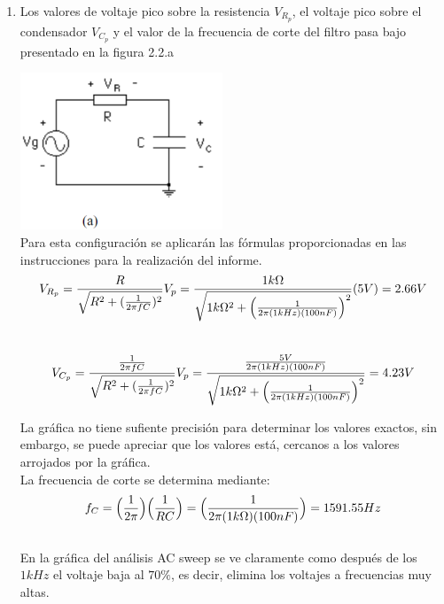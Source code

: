 \documentclass[12pt]{article}
\begin{document}
\begin{enumerate}
		\item Los valores de voltaje pico sobre la resistencia $V_{R_p}$, el
		voltaje pico sobre el condensador $V_{C_p}$ y el valor de la
		frecuencia de corte del filtro pasa bajo presentado en la figura 2.2.a
		
		\includegraphics{Img/2_2_a}\\
		
		\noindent Para esta configuración se aplicarán las fórmulas proporcionadas en las instrucciones para la realización del informe.\\
		
		\begin{equation}
			\notag V_{R_p} = \frac{R}{\sqrt{R^2 + (\frac{1}{2\pi f C})^2}}V_p = \frac{1k\Omega}{\sqrt{1k\Omega ^2 + \Big (\frac{1}{2\pi (1kHz) (100nF)}\Big)^2}}(5V) = 2.66V
		\end{equation}
		\\
		
		\begin{equation}
			\notag V_{C_p} = \frac{\frac{1}{2 \pi f C}}{\sqrt{R^2 + (\frac{1}{2\pi f C})^2}}V_p = \frac{\frac{5V}{2\pi (1kHz) (100nF)}}{\sqrt{1k\Omega ^2 + \Big (\frac{1}{2\pi (1kHz) (100nF)}\Big)^2}} = 4.23V
		\end{equation}
		
		\noindent La gráfica no tiene sufiente precisión para determinar los valores exactos, sin embargo, se puede apreciar que los valores está, cercanos a los valores arrojados por la gráfica.\\
		
		\noindent La frecuencia de corte se determina mediante:\\
		
		\begin{equation}
			\notag f_C = \Big(\frac{1}{2\pi}\Big)\Big(\frac{1}{RC}\Big) = \Big(\frac{1}{2\pi (1k\Omega)(100nF)}\Big) = 1591.55Hz
		\end{equation}\\
		
		\noindent En la gráfica del análisis AC sweep se ve claramente como después de los $1kHz$ el voltaje baja al $70\%$, es decir, elimina los voltajes a frecuencias muy altas.\\
		

\end{enumerate}
\end{document}
